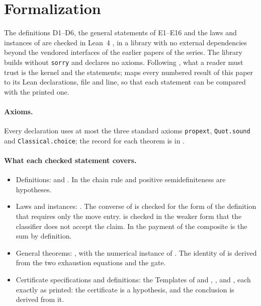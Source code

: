 \section{Formalization}\label{sec:lean}

The definitions D1--D6, the general statements of E1--E16 and the laws and instances of
 are checked in Lean~4 \citep{DeMouraUllrich2021}, in a library with no external
dependencies beyond the vendored interfaces of the earlier papers of the series. The library builds
without \texttt{sorry} and declares no axioms. Following \citet{Pollack1998}, what a reader must
trust is the kernel and the statements;  maps every numbered result of this
paper to its Lean declarations, file and line, so that each statement can be compared with the
printed one.

\paragraph{Axioms.} Every declaration uses at most the three standard axioms \texttt{propext},
\texttt{Quot.sound} and \texttt{Classical.choice}; the record for each theorem is in
.

\paragraph{What each checked statement covers.}
\begin{itemize}
  \item Definitions:  and . In
     the chain rule and positive semidefiniteness are hypotheses.
  \item Laws and instances: .
    The converse of  is checked for the form of the definition that requires
    only the move entry.  is checked in the weaker form that the classifier does
    not accept the claim. In  the payment of the composite is the sum by
    definition.
  \item General theorems: ,
    with the numerical instance  of . The
    identity of  is derived from the two exhaustion equations and the gate.
  \item Certificate specifications and definitions: the Templates of  and
    ,
    , and , each exactly as printed: the certificate is
    a hypothesis, and the conclusion is derived from it.
\end{itemize}

